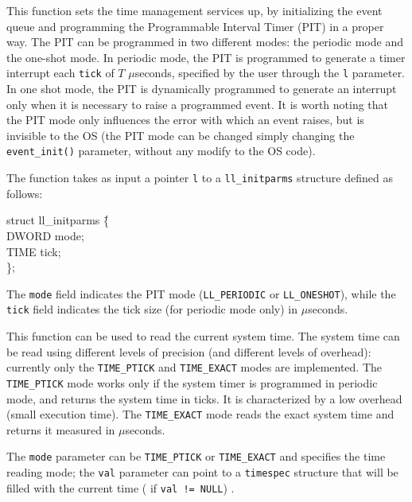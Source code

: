 \documentclass[a4paper]{report}
\begin{document}
This function sets the time management services up, by initializing
the event queue and programming the Programmable Interval Timer (PIT)
in a proper way. The PIT can be programmed in two
different modes: the periodic mode and the one-shot mode. In periodic
mode, the PIT is programmed to generate a timer interrupt each {\tt tick}
of $T$ $\mu$seconds, specified by the user through the {\tt l}
parameter. In one shot mode, the PIT is dynamically programmed to
generate an interrupt only when it is necessary to raise a
programmed event. It is worth noting that the PIT mode only
influences the error with which an event raises, but is invisible to
the OS (the PIT mode can be changed simply changing the {\tt event\_init()}
parameter, without any modify to the OS code).

The function takes as input a pointer {\tt l} to a {\tt ll\_initparms}
structure defined as follows:

\begin{minipage}[t]{15cm}
\begin{tt}
\begin{tabbing}
struct ll\_initparms \= \{      \\
\>      DWORD mode;             \\
\>      TIME tick;              \\
\}; 
\end{tabbing}
\end{tt}
\end{minipage}

The {\tt mode} field indicates the PIT mode ({\tt LL\_PERIODIC} or
{\tt LL\_ONESHOT}), while the {\tt tick} field indicates the tick size
(for periodic mode only) in $\mu$seconds.


This function can be used to read the current system time. The system
time can be read using different levels of precision (and different
levels of overhead): currently only the {\tt TIME\_PTICK} and
{\tt TIME\_EXACT} modes are implemented. The {\tt TIME\_PTICK} mode
works only if the system timer is programmed in periodic mode, and
returns the system time in ticks. It is characterized by a low
overhead (small execution time). The {\tt TIME\_EXACT} mode reads the
exact system time and returns it measured in $\mu$seconds.

The {\tt mode} parameter can be {\tt TIME\_PTICK} or {\tt TIME\_EXACT} 
and specifies the time reading mode; the {\tt val} parameter can 
point to a {\tt timespec} structure that will be filled
with the current time ( if {\tt val != NULL}) .
\end{document}
